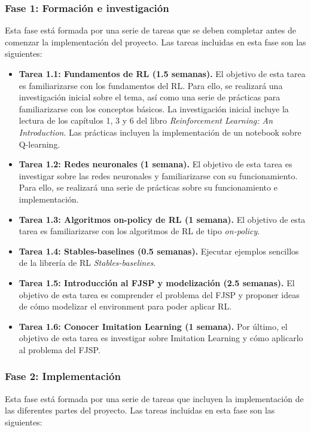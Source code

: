 \subsubsection{Fase 1: Formación e investigación}
Esta fase está formada por una serie de tareas que se deben completar antes de
comenzar la implementación del proyecto. Las tareas incluidas en esta fase son
las siguientes:

\begin{itemize}
    \item \textbf{Tarea 1.1: Fundamentos de RL (1.5 semanas).} El objetivo de esta tarea es
          familiarizarse con los fundamentos del RL\@. Para ello, se realizará una investigación
          inicial sobre el tema, así como una serie de prácticas para familiarizarse con los
          conceptos básicos. La investigación inicial incluye la lectura de los capítulos 1, 3 y 6
          del libro \textit{Reinforcement Learning: An Introduction}\cite{sutton2018reinforcement}.
          Las prácticas incluyen la implementación de un notebook sobre Q-learning.
    \item \textbf{Tarea 1.2: Redes neuronales (1 semana).} El objetivo de esta tarea es
          investigar sobre las redes neuronales y familiarizarse con su funcionamiento. Para ello,
          se realizará una serie de prácticas sobre su funcionamiento e implementación.
    \item \textbf{Tarea 1.3: Algoritmos on-policy de RL (1 semana).} El objetivo de esta tarea
          es familiarizarse con los algoritmos de RL de tipo \textit{on-policy}.
    \item \textbf{Tarea 1.4: Stables-baselines (0.5 semanas).} Ejecutar ejemplos sencillos
          de la librería de RL \textit{Stables-baselines}\cite{stable-baselines3}.
    \item \textbf{Tarea 1.5: Introducción al FJSP y modelización (2.5 semanas).} El
          objetivo de esta tarea es comprender el problema del FJSP y proponer ideas de cómo
          modelizar el environment para poder aplicar RL\@.
    \item \textbf{Tarea 1.6: Conocer Imitation Learning (1 semana).} Por último, el objetivo
          de esta tarea es investigar sobre Imitation Learning y cómo aplicarlo al problema del
          FJSP\@.
\end{itemize}

\subsubsection{Fase 2: Implementación}
Esta fase está formada por una serie de tareas que incluyen la implementación
de las diferentes partes del proyecto. Las tareas incluidas en esta fase son
las siguientes:

